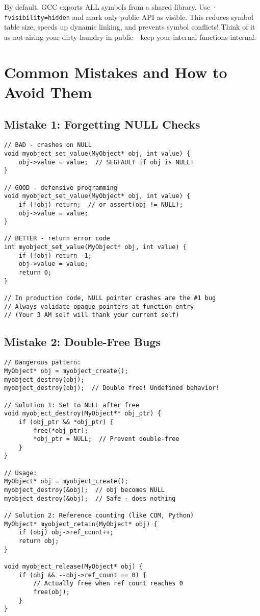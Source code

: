\begin{warningbox}
By default, GCC exports ALL symbols from a shared library. Use \texttt{-fvisibility=hidden} and mark only public API as visible. This reduces symbol table size, speeds up dynamic linking, and prevents symbol conflicts! Think of it as not airing your dirty laundry in public—keep your internal functions internal.
\end{warningbox}

\section{Common Mistakes and How to Avoid Them}

\subsection{Mistake 1: Forgetting NULL Checks}

\begin{lstlisting}
// BAD - crashes on NULL
void myobject_set_value(MyObject* obj, int value) {
    obj->value = value;  // SEGFAULT if obj is NULL!
}

// GOOD - defensive programming
void myobject_set_value(MyObject* obj, int value) {
    if (!obj) return;  // or assert(obj != NULL);
    obj->value = value;
}

// BETTER - return error code
int myobject_set_value(MyObject* obj, int value) {
    if (!obj) return -1;
    obj->value = value;
    return 0;
}

// In production code, NULL pointer crashes are the #1 bug
// Always validate opaque pointers at function entry
// (Your 3 AM self will thank your current self)
\end{lstlisting}

\subsection{Mistake 2: Double-Free Bugs}

\begin{lstlisting}
// Dangerous pattern:
MyObject* obj = myobject_create();
myobject_destroy(obj);
myobject_destroy(obj);  // Double free! Undefined behavior!

// Solution 1: Set to NULL after free
void myobject_destroy(MyObject** obj_ptr) {
    if (obj_ptr && *obj_ptr) {
        free(*obj_ptr);
        *obj_ptr = NULL;  // Prevent double-free
    }
}

// Usage:
MyObject* obj = myobject_create();
myobject_destroy(&obj);  // obj becomes NULL
myobject_destroy(&obj);  // Safe - does nothing

// Solution 2: Reference counting (like COM, Python)
MyObject* myobject_retain(MyObject* obj) {
    if (obj) obj->ref_count++;
    return obj;
}

void myobject_release(MyObject* obj) {
    if (obj && --obj->ref_count == 0) {
        // Actually free when ref count reaches 0
        free(obj);
    }
}
\end{lstlisting}

